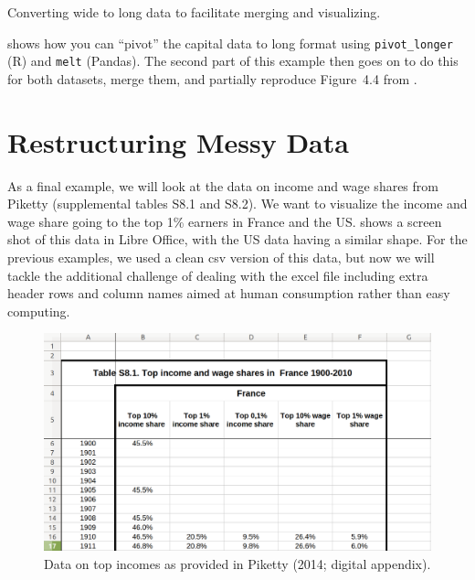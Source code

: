 \begin{ccsexample}
  \begin{tcolorbox}[title=Output]
    \texttt{[image: \{snippets/chapter06/merge2.r]}.png}
  \end{tcolorbox}
  \caption{Converting wide to long data to facilitate merging and visualizing.}\label{ex:merge2}
\end{ccsexample}

 shows how you can ``pivot'' the capital data to long format using \texttt{pivot\_longer} (R) and \texttt{melt} (Pandas). The second part of this example then goes on to do this for both datasets, merge them, and partially reproduce Figure~4.4 from \citet{piketty}.

\section{Restructuring Messy Data}

As a final example, we will look at the data on income and wage shares from Piketty (supplemental tables S8.1 and S8.2).
We want to visualize the income and wage share going to the top 1\% earners in France and the US.
 shows a screen shot of this data in Libre Office, with the US data having a similar shape.
For the previous examples, we used a clean csv version of this data, but now we will tackle the additional challenge
of dealing with the excel file including extra header rows and column names aimed at human consumption rather than easy computing.

\begin{figure}
  \includegraphics[width=\linewidth]{chapter06/messy.png}
  \caption{Data on top incomes as provided in Piketty (2014; digital appendix).}\label{fig:messy}
\end{figure}

